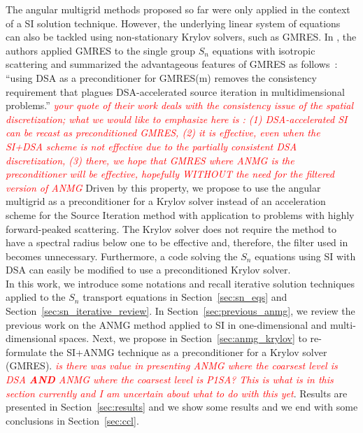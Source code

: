 \documentclass[preprint,10pt]{elsarticle}
\renewcommand{\(}{\left(}
\renewcommand{\)}{\right)}
\renewcommand{\[}{\left[}
\renewcommand{\]}{\right]}
\newcommand{\tri}[1]{\textcolor{red}{{\it #1}}}
\newcommand{\sct}[1]{Section~\ref{#1}}                   %
\begin{document}
The angular multigrid methods proposed so far were only applied in the context
of a SI solution technique. However, the underlying linear system of equations 
can also be tackled using non-stationary 
Krylov solvers, such as GMRES. In \cite{ttg}, the authors applied GMRES to
the single group $S_n$ equations with isotropic scattering and 
summarized the advantageous features of GMRES as follows~: ``using DSA as a 
preconditioner for GMRES(m) removes the consistency requirement that plagues 
DSA-accelerated source iteration in multidimensional problems.'' 
\tri{your quote of their work deals with the consistency issue of the spatial discretization;
what we would like to emphasize here is : (1) DSA-accelerated SI can be recast as preconditioned GMRES,
(2) it is effective, even when the SI+DSA scheme is not effective due to the partially consistent DSA discretization, (3) there, we 
hope that GMRES where ANMG is the preconditioner will be effective, hopefully WITHOUT the need for the filtered version of ANMG}
Driven by this
property, we propose to use the angular multigrid as a preconditioner for a 
Krylov solver instead of an acceleration scheme for the Source Iteration
method with application to problems with highly forward-peaked scattering. 
The Krylov solver does not require the method to have a spectral
radius below one to be effective and, therefore, the filter used in
\cite{multigrid_2d} becomes
unnecessary. Furthermore, a code solving the $S_n$ equations using SI with DSA can easily
be modified to use a preconditioned Krylov solver. \\

In this work, we introduce some notations and recall iterative solution techniques applied 
to the $S_n$ transport equations in \sct{sec:sn_eqs} and \sct{sec:sn_iterative_review}. 
In \sct{sec:previous_anmg}, we review the previous work on the ANMG method applied to SI in one-dimensional and multi-dimensional spaces.
Next, we propose in \sct{sec:anmg_krylov} to re-formulate the SI+ANMG technique as a preconditioner for a Krylov solver (GMRES).
\tri{is there was value in presenting ANMG where the coarsest level is DSA {\bf AND}  ANMG where the coarsest level is P1SA? This is what is in this section currently and I am uncertain about what to do with this yet}. 
Results are presented in \sct{sec:results} and we show some results and we end with some conclusions in \sct{sec:ccl}.

\end{document}
